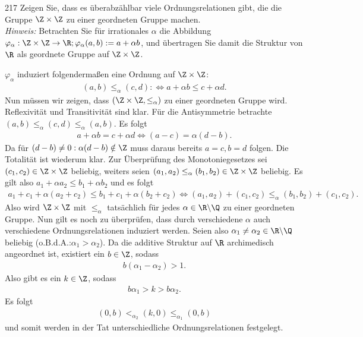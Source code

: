 \begin{algebraUE}{217}
Zeigen Sie, dass es überabzählbar viele Ordnungsrelationen gibt, die die Gruppe
$\Z \times \Z$ zu einer geordneten Gruppe machen. \\
\textit{Hinweis:} Betrachten Sie für irrationales $\alpha$ die Abbildung
$\varphi_{\alpha}: \Z \times \Z \to \R; \varphi_{\alpha}(a,b) := a + \alpha b$,
und übertragen Sie damit die Struktur von $\R$ als geordnete Gruppe auf $\Z \times \Z$.
\end{algebraUE}
\begin{solution}
$\varphi_{\alpha}$ induziert folgendermaßen eine Ordnung auf $\Z \times \Z$:
\begin{align*}
  (a,b) \leq_{\alpha} (c,d) :\iff a + \alpha b \leq c + \alpha d.
\end{align*}
Nun müssen wir zeigen, dass $(\Z \times \Z, \leq_{\alpha})$ zu einer geordneten Gruppe wird.
Reflexivität und Transitivität sind klar.
Für die Antisymmetrie betrachte $(a,b) \leq_{\alpha} (c,d) \leq_{\alpha} (a,b)$. Es folgt
\begin{align*}
  a + \alpha b= c + \alpha d \iff (a-c) = \alpha (d-b).
\end{align*}
Da für $(d-b)\neq 0: \alpha (d-b) \notin \Z$ muss daraus bereits $a=c, b=d$ folgen.
Die Totalität ist wiederum klar.
Zur Überprüfung des Monotoniegesetzes sei $(c_1,c_2) \in \Z \times \Z$ beliebig,
weiters seien $(a_1,a_2) \leq_{\alpha} (b_1,b_2) \in \Z \times \Z$ beliebig.
Es gilt also $a_1 + \alpha a_2 \leq b_1 + \alpha b_2$ und es folgt
\begin{align*}
  a_1 + c_1 + \alpha (a_2 + c_2) \leq b_1 + c_1 + \alpha (b_2 + c_2) \iff
  (a_1,a_2) + (c_1,c_2) \leq_{\alpha} (b_1,b_2) + (c_1,c_2).
\end{align*}
Also wird $\Z \times \Z$ mit $\leq_{\alpha}$ tatsächlich für jedes $\alpha \in \R\backslash\Q$
zu einer geordneten Gruppe. Nun gilt es noch zu überprüfen, dass durch
verschiedene $\alpha$ auch verschiedene Ordnungsrelationen induziert werden.
Seien also $\alpha_1 \neq \alpha_2 \in \R\backslash\Q$ beliebig
(o.B.d.A.:$\alpha_1 > \alpha_2$).
Da die additive Struktur auf $\R$ archimedisch angeordnet ist, existiert ein $b \in \Z$, sodass
\begin{align*}
  b(\alpha_1 - \alpha_2) > 1.
\end{align*}
Also gibt es ein $k \in \Z$, sodass
\begin{align*}
  b\alpha_1 > k > b\alpha_2.
\end{align*}
Es folgt
\begin{align*}
  (0,b) <_{\alpha_2} (k,0) \leq_{\alpha_1} (0,b)
\end{align*}
und somit werden in der Tat unterschiedliche Ordnungsrelationen festgelegt.
\end{solution}
